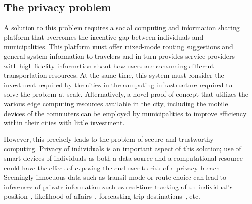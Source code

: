 \documentclass[12pt,letterpaper]{article}
\begin{document}
\subsection{The privacy problem}
A solution to this problem requires a social computing and information sharing platform that overcomes the incentive gap between individuals and municipalities. This platform must offer mixed-mode routing suggestions and general system information to travelers and in turn provides service providers with high-fidelity information about how users are consuming different transportation resources. At the same time, this system must consider the investment required by the cities in the computing infrastructure required to solve the problem at scale. Alternatively, a novel proof-of-concept that utilizes the various edge computing resources available in the city, including the mobile devices of the commuters can be employed by municipalities to improve efficiency within their cities with little investment.

However, this precisely leads to the problem of secure and trustworthy computing.  Privacy of individuals is an important aspect of this solution; use of smart devices of individuals as both a data source and a computational resource  could have the effect of exposing the end-user to risk of a privacy breach. Seemingly innocuous data such as transit mode or route choice can lead to inferences of
private information such as real-time tracking of an individual's position~\cite{koufogiannis:2015aa}, likelihood of affairs~\cite{mueffelmann:2015aa}, forecasting trip destinations~\cite{dewri:2013aa}, etc.


\clearpage


\end{document}
